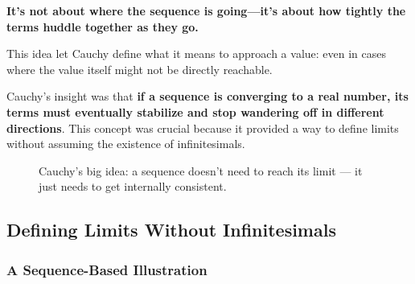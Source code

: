 \textbf{It’s not about where the sequence is going—it’s about how tightly the terms huddle together as they go.}



This idea let Cauchy define what it means to approach a value: even in cases where the value itself might not be directly reachable.

Cauchy’s insight was that \textbf{if a sequence is converging to a real number, its terms must eventually stabilize and stop wandering off in different directions}. This concept was crucial because it provided a way to define limits without assuming the existence of infinitesimals.




\begin{figure}[H]
\centering
{}
\caption{Cauchy’s big idea: a sequence doesn’t need to reach its limit — it just needs to get internally consistent.}
\end{figure}



\subsection{Defining Limits Without Infinitesimals}

\subsubsection{A Sequence-Based Illustration}

